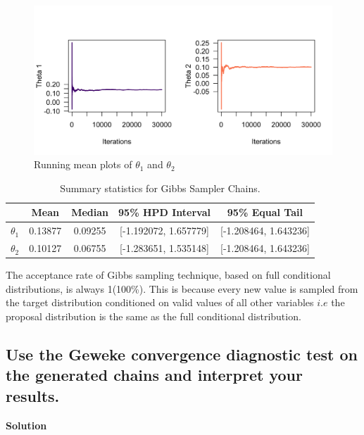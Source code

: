\documentclass[12pt]{article}
\begin{document}
\begin{figure}[h!]
    \centering
    \includegraphics[width=0.8\linewidth]{pictures/fig04-gs-runmean.png}
    \caption{Running mean plots of $\theta_1$ and $\theta_2$ }
    \label{fig:gs-runmean}
\end{figure}

\begin{table}[h!]
\centering
\caption{Summary statistics for Gibbs Sampler Chains.}
\begin{tabular}{lcccc}
\toprule
\textbf{} & \textbf{Mean} & \textbf{Median} & \textbf{95\% HPD Interval}  & \textbf{95\% Equal Tail} \\
\midrule
$\theta_1$ & 0.13877 & 0.09255 & [-1.192072, 1.657779] & [-1.208464, 1.643236] \\
$\theta_2$ & 0.10127 & 0.06755 & [-1.283651, 1.535148] & [-1.208464, 1.643236] \\
\bottomrule
\end{tabular}
\label{tab:summary_gs}
\end{table}

The acceptance rate of Gibbs sampling technique, based on full conditional distributions, is always 1(100\%). This is because every new value is sampled from the target distribution conditioned on valid values of all other variables $i.e$ the proposal distribution is the same as the full conditional distribution.
\subsection{Use the Geweke convergence diagnostic test on the generated chains and interpret your results.}
\textbf{Solution}
\end{document}
